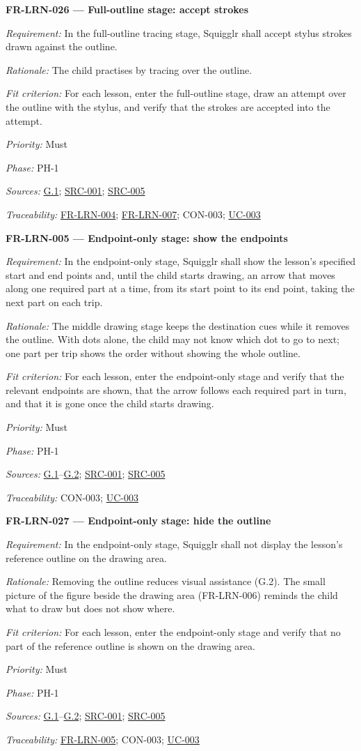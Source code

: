 \documentclass[12pt]{article}
\renewcommand{\_}{\textunderscore\allowbreak}%
\newcommand{\goalref}[1]{\hyperref[goal:#1]{G.#1}}
\newcommand{\ucref}[1]{\hyperref[uc:#1]{\mbox{UC-#1}}}
\newenvironment{srsrequirement}[2]{%
  \par\medskip\noindent\phantomsection\label{req:#1}%
  \textbf{#1 --- #2}\par\nobreak\smallskip }{\par\medskip}
\newcommand{\reqfield}[2]{\noindent\textit{#1:} #2\par}
\newcommand{\reqshall}[1]{\reqfield{Requirement}{#1}}
\newcommand{\reqrationale}[1]{\reqfield{Rationale}{#1}}
\newcommand{\reqfit}[1]{\reqfield{Fit criterion}{#1}}
\newcommand{\reqpriority}[1]{\reqfield{Priority}{#1}}
\newcommand{\reqphase}[1]{\reqfield{Phase}{#1}}
\newcommand{\reqsources}[1]{\reqfield{Sources}{#1}}
\newcommand{\reqtraces}[1]{\reqfield{Traceability}{#1}}
\newcommand{\reqref}[1]{\hyperref[req:#1]{#1}}
\newcommand{\srcref}[1]{\hyperref[src:#1]{SRC-#1}}
\providecommand{\ucref}[1]{\hyperref[uc:#1]{UC-#1}}
\begin{document}
\begin{srsrequirement}{FR-LRN-026}{Full-outline stage: accept strokes}
  \reqshall{In the full-outline tracing stage, Squigglr shall accept stylus
strokes drawn against the outline.} \reqrationale{The child practises by
tracing over the outline.} \reqfit{For each lesson, enter the full-outline
stage, draw an attempt over the outline with the stylus, and verify that the
strokes are accepted into the attempt.}
  \reqpriority{Must}
  \reqphase{PH-1}
  \reqsources{\goalref{1}; \srcref{001}; \srcref{005}}
  \reqtraces{\reqref{FR-LRN-004}; \reqref{FR-LRN-007}; CON-003; \ucref{003}}
\end{srsrequirement}

\begin{srsrequirement}{FR-LRN-005}{Endpoint-only stage: show the endpoints}
  \reqshall{In the endpoint-only stage, Squigglr shall show the lesson's
specified start and end points and, until the child starts drawing, an arrow
that moves along one required part at a time, from its start point to its end
point, taking the next part on each trip.} \reqrationale{The middle drawing
stage keeps the destination cues while it removes the outline. With dots alone,
the child may not know which dot to go to next; one part per trip shows the
order without showing the whole outline.} \reqfit{For each lesson, enter the
endpoint-only stage and verify that the relevant endpoints are shown, that the
arrow follows each required part in turn, and that it is gone once the child
starts drawing.}
  \reqpriority{Must}
  \reqphase{PH-1}
  \reqsources{\goalref{1}--\goalref{2}; \srcref{001}; \srcref{005}}
  \reqtraces{CON-003; \ucref{003}}
\end{srsrequirement}

\begin{srsrequirement}{FR-LRN-027}{Endpoint-only stage: hide the outline}
  \reqshall{In the endpoint-only stage, Squigglr shall not display the lesson's
reference outline on the drawing area.} \reqrationale{Removing the outline
reduces visual assistance (G.2). The small picture of the figure beside the
drawing area (FR-LRN-006) reminds the child what to draw but does not show
where.} \reqfit{For each lesson, enter the endpoint-only stage and verify that
no part of the reference outline is shown on the drawing area.}
  \reqpriority{Must}
  \reqphase{PH-1}
  \reqsources{\goalref{1}--\goalref{2}; \srcref{001}; \srcref{005}}
  \reqtraces{\reqref{FR-LRN-005}; CON-003; \ucref{003}}
\end{srsrequirement}
\end{document}
